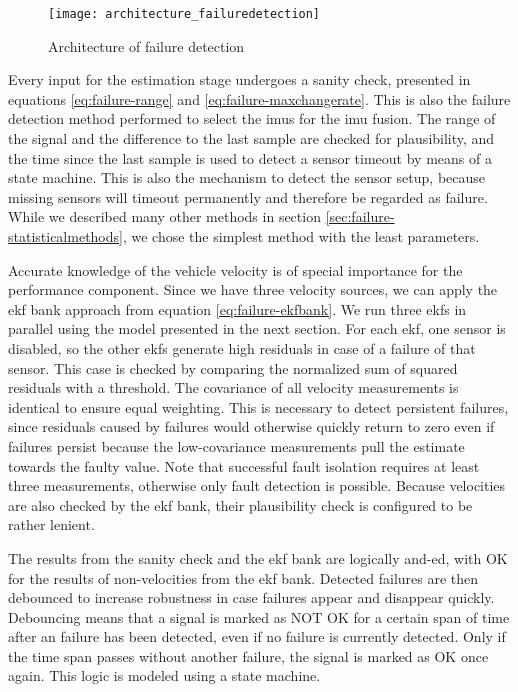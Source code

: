 \begin{figure}
	\centering
	\texttt{[image: architecture\_failuredetection]}%
	\caption{Architecture of failure detection}
	\label{fig:architecture-failuredetection}
\end{figure}

Every input for the estimation stage undergoes a sanity check, presented in equations \ref{eq:failure-range} and \ref{eq:failure-maxchangerate}. This is also the failure detection method performed to select the \glspl{imu} for the \gls{imu} fusion. The range of the signal and the difference to the last sample are checked for plausibility, and the time since the last sample is used to detect a sensor timeout by means of a state machine. This is also the mechanism to detect the sensor setup, because missing sensors will timeout permanently and therefore be regarded as failure. While we described many other methods in section \ref{sec:failure-statisticalmethods}, we chose the simplest method with the least parameters.

Accurate knowledge of the vehicle velocity is of special importance for the performance component. Since we have three velocity sources, we can apply the \gls{ekf} bank approach from equation \ref{eq:failure-ekfbank}. We run three \glspl{ekf} in parallel using the model presented in the next section. For each \gls{ekf}, one sensor is disabled, so the other \glspl{ekf} generate high residuals in case of a failure of that sensor. This case is checked by comparing the normalized sum of squared residuals with a threshold. The covariance of all velocity measurements is identical to ensure equal weighting. This is necessary to detect persistent failures, since residuals caused by failures would otherwise quickly return to zero even if failures persist because the low-covariance measurements pull the estimate towards the faulty value. Note that successful fault isolation requires at least three measurements, otherwise only fault detection is possible. Because velocities are also checked by the \gls{ekf} bank, their plausibility check is configured to be rather lenient.

The results from the sanity check and the \gls{ekf} bank are logically and-ed, with OK for the results of non-velocities from the \gls{ekf} bank. Detected failures are then debounced to increase robustness in case failures appear and disappear quickly. Debouncing means that a signal is marked as NOT OK for a certain span of time after an failure has been detected, even if no failure is currently detected. Only if the time span passes without another failure, the signal is marked as OK once again. This logic is modeled using a state machine.

